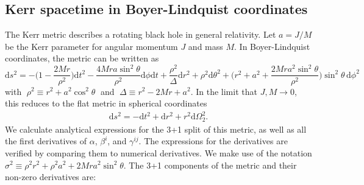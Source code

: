 \documentclass{article}
\begin{document}
\subsection{Kerr spacetime in Boyer-Lindquist coordinates}

The Kerr metric describes a rotating black hole in general relativity. Let $a=J/M$ be the Kerr parameter for angular momentum $J$ and mass $M$. In Boyer-Lindquist coordinates, the metric can be written as
\begin{equation}
    \text{d}s^2 = -\Big(1 - \frac{2Mr}{\rho^2}\Big)\text{d}t^2 - \frac{4Mra\sin^2\theta}{\rho^2}\text{d}\phi\text{d}t + \frac{\rho^2}{\Delta}\text{d}r^2 + \rho^2\text{d}\theta^2 + \Big(r^2 + a^2 + \frac{2Mra^2\sin^2\theta}{\rho^2}\Big)\sin^2\theta\,\text{d}\phi^2
\end{equation}
with $\;\rho^2 \equiv r^2 + a^2 \cos^2\theta\;$ and $\;\Delta \equiv r^2 - 2Mr + a^2$. In the limit that $J,M\to0$, this reduces to the flat metric in spherical coordinates
\begin{align}
  \text{d}s^2=-\text{d}t^2+\text{d}r^2+r^2\text{d}\Omega_2^2.
\end{align}
We calculate analytical expressions for the 3+1 split of this metric, as well as all the first derivatives of $\alpha$, $\beta^i$, and $\gamma^{ij}$. The expressions for the derivatives are verified by comparing them to numerical derivatives. We make use of the notation $\sigma^2 \equiv \rho^2r^2 + \rho^2a^2 + 2Mra^2\sin^2\theta$. The 3+1 components of the metric and their non-zero derivatives are:
\end{document}
